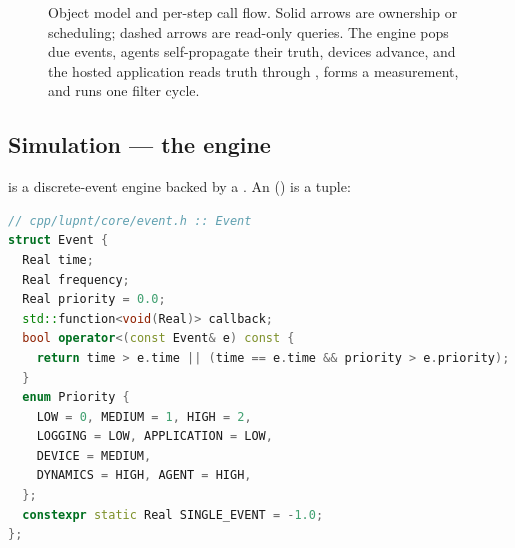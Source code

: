 \begin{figure}[H]
  \caption{Object model and per-step call flow. Solid arrows are ownership or
           scheduling; dashed arrows are read-only queries. The engine pops due
           events, agents self-propagate their truth, devices advance, and the
           hosted application reads truth through , forms a
           measurement, and runs one filter cycle.}
  \label{fig:sim-object-model}
\end{figure}

\subsection{Simulation --- the engine}
\label{sec:sim-engine}

 is a discrete-event engine backed by a
. An  ()
is a  tuple:

\begin{lstlisting}[language=cpp, caption={The event record and its ordering.}, label={lst:sim-event}]
// cpp/lupnt/core/event.h :: Event
struct Event {
  Real time;
  Real frequency;
  Real priority = 0.0;
  std::function<void(Real)> callback;
  bool operator<(const Event& e) const {
    return time > e.time || (time == e.time && priority > e.priority);
  }
  enum Priority {
    LOW = 0, MEDIUM = 1, HIGH = 2,
    LOGGING = LOW, APPLICATION = LOW,
    DEVICE = MEDIUM,
    DYNAMICS = HIGH, AGENT = HIGH,
  };
  constexpr static Real SINGLE_EVENT = -1.0;
};
\end{lstlisting}

